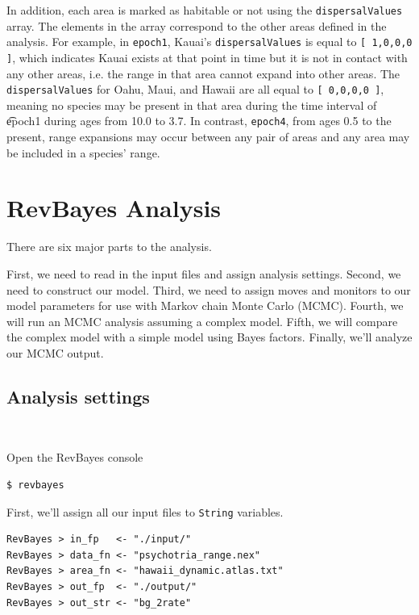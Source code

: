 \documentclass[11pt]{article}
\newcommand{\impmark}{\strut\vadjust{\domark}}
\newcommand{\domark}{%
  \vbox to 0pt{
    \kern-\dp\strutbox
    \smash{\llap{$\rightarrow$\kern1em}}
    \vss
  }%
}
\begin{document}
In addition, each area is marked as habitable or not using the {\tt dispersalValues} array.
The elements in the array correspond to the other areas defined in the analysis.
For example, in {\tt epoch1}, Kauai's {\tt dispersalValues} is equal to {\tt [ 1,0,0,0 ]}, which indicates Kauai exists at that point in time but it is not in contact with any other areas, i.e. the range in that area cannot expand into other areas.
The {\tt dispersalValues} for Oahu, Maui, and Hawaii are all equal to {\tt [ 0,0,0,0 ]}, meaning no species may be present in that area during the time interval of {\t epoch1} during ages from 10.0 to 3.7. In contrast, {\tt epoch4}, from ages 0.5 to the present, range expansions may occur between any pair of areas and any area may be included in a species' range.

\section{RevBayes Analysis}

There are six major parts to the analysis.

First, we need to read in the input files and assign analysis settings.
Second, we need to construct our model.
Third, we need to assign moves and monitors to our model parameters for use with Markov chain Monte Carlo (MCMC).
Fourth, we will run an MCMC analysis assuming a complex model.
Fifth, we will compare the complex model with a simple model using Bayes factors.
Finally, we'll analyze our MCMC output.

\subsection{Analysis settings}

\setlength{\parindent}{0pt}

\noindent \\ \impmark Open the RevBayes console

\begin{snugshade}
\begin{lstlisting}
$ revbayes
\end{lstlisting}
\end{snugshade}

First, we'll assign all our input files to {\tt String} variables.
\begin{snugshade}
\begin{lstlisting}
RevBayes > in_fp   <- "./input/"
RevBayes > data_fn <- "psychotria_range.nex"
RevBayes > area_fn <- "hawaii_dynamic.atlas.txt"
RevBayes > out_fp  <- "./output/"
RevBayes > out_str <- "bg_2rate"
\end{lstlisting}
\end{snugshade}
\end{document}
